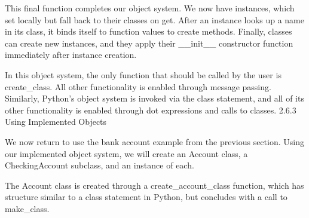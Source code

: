 \documentclass[letterpaper,10pt,dvipdfmx]{sphinxmanual}
\begin{document}
This final function completes our object system. We now have instances, which set locally but fall back to their classes on get. After an instance looks up a name in its class, it binds itself to function values to create methods. Finally, classes can create new instances, and they apply their \_\_init\_\_ constructor function immediately after instance creation.

In this object system, the only function that should be called by the user is create\_class. All other functionality is enabled through message passing. Similarly, Python's object system is invoked via the class statement, and all of its other functionality is enabled through dot expressions and calls to classes.
2.6.3   Using Implemented Objects

We now return to use the bank account example from the previous section. Using our implemented object system, we will create an Account class, a CheckingAccount subclass, and an instance of each.

The Account class is created through a create\_account\_class function, which has structure similar to a class statement in Python, but concludes with a call to make\_class.
\end{document}
